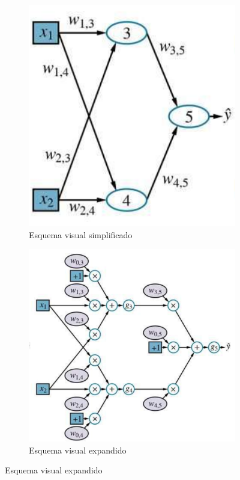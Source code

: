 \begin{figure}[h]
    \centering

    \begin{subfigure}[b]{0.4\textwidth}
        \centering
        \includegraphics[width=\textwidth]{capitulos/cap_02/imagenes/neural_network_1.png}
        \caption{Esquema visual simplificado}
        \label{fig:neural_network_simplified}
    \end{subfigure}
    \hfill
    \begin{subfigure}[b]{0.55\textwidth}
        \centering
        \includegraphics[width=\textwidth]{capitulos/cap_02/imagenes/neural_network_2.png}
        \caption{Esquema visual expandido}
        \label{fig:neural_network_expanded}
    \end{subfigure}


\end{figure}
